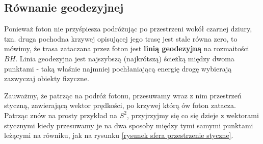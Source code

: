 \subsection{Równanie geodezyjnej} %

%

Ponieważ foton nie przyśpiesza podróżując po przestrzeni wokół czarnej dziury, tzn. druga pochodna krzywej opisującej jego trasę jest stale równa zero, to mówimy, że trasa zataczana przez foton jest \textbf{linią geodezyjną} na rozmaitości $BH$. Linia geodezyjna jest najszybszą (najkrótszą) ścieżką między dwoma punktami - taką właśnie najmniej pochłaniającą energię drogę wybierają zazwyczaj obiekty fizyczne.

Zauważmy, że patrząc na podróż fotonu, przesuwamy wraz z nim przestrzeń styczną, zawierającą wektor prędkości, po krzywej którą ów foton zatacza. Patrząc znów na prosty przykład na $S^2$, przyjrzyjmy się co się dzieje z wektorami stycznymi kiedy przesuwamy je na dwa sposoby między tymi samymi punktami leżącymi na równiku, jak na rysunku \ref{rysunek sfera przestrzenie styczne}.

